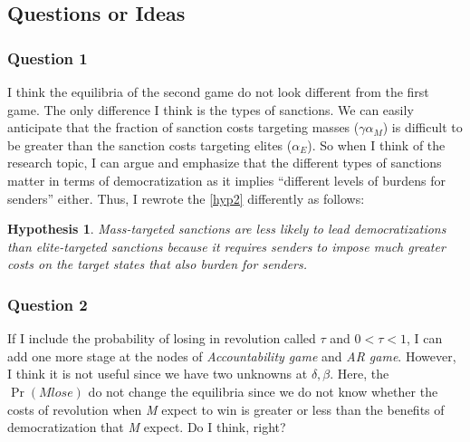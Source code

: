\documentclass[11pt]{article}
\newtheorem{hyp}{Hypothesis}
\begin{document}
	
	\subsection*{Questions or Ideas}
	\subsubsection*{Question 1}
	I think the equilibria of the second game do not look different from the first game. The only difference I think is the types of sanctions. We can easily anticipate that the fraction of sanction costs targeting masses ($\gamma\alpha_{M}$) is difficult to be greater than the sanction costs targeting elites ($\alpha_{E}$). So when I think of the research topic, I can argue and emphasize that the different types of sanctions matter in terms of democratization as it implies ``different levels of burdens for senders'' either. Thus, I rewrote the \ref{hyp2} differently as follows:
	
	\begin{hyp}
		Mass-targeted sanctions are less likely to lead democratizations than elite-targeted sanctions because it requires senders to impose much greater costs on the target states that also burden for senders.
	\end{hyp}
	
	\subsubsection*{Question 2}
	If I include the probability of losing in revolution called $\tau$ and $0 < \tau < 1$, I can add one more stage at the nodes of \textit{Accountability game} and \textit{AR game}. However, I think it is not useful since we have two unknowns at $\delta, \beta$. Here, the $\Pr(\textit{M} lose)$ do not change the equilibria since we do not know whether the costs of revolution when \textit{M} expect to win is greater or less than the benefits of democratization that \textit{M} expect. Do I think, right?
	
\end{document}
